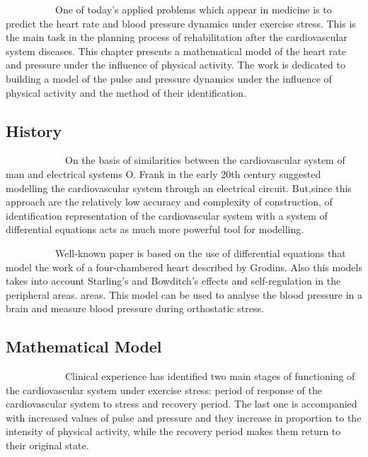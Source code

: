 \par ~~~~~~~~~~One of today’s applied problems which appear in medicine is to predict the heart rate and blood pressure dynamics under exercise stress. This is the main task in the planning process of rehabilitation after the cardiovascular system diseases. This chapter presents a mathematical model of the heart rate and pressure under the influence of physical activity. The work is dedicated to building a model of the pulse and pressure dynamics under the influence of physical activity and the method of their identification.
\subsection*{History}
\par ~~~~~~~~~~~~On the basis of similarities between the cardiovascular system of man and electrical systems O. Frank in the early 20th century suggested modelling the cardiovascular system through an electrical circuit. But,since this approach are the relatively low accuracy and complexity of construction, of identification representation of the cardiovascular system with a system of differential equations acts as much more powerful tool for modelling.

\par ~~~~~~~~~~Well-known paper is based on the use of differential equations that model the work of a four-chambered heart described by Grodins. Also this models takes into account Starling’s and Bowditch’s effects
and self-regulation in the peripheral areas. areas. This model can be used to analyse the blood pressure in a brain and measure blood pressure during orthostatic stress.

\subsection*{Mathematical Model}
\par ~~~~~~~~~~~~Clinical experience has identified two main stages of functioning of the cardiovascular system under exercise stress: period of response of the cardiovascular system to stress and recovery period. The last one is accompanied with increased values of pulse and pressure and they increase in proportion to the intensity of physical activity, while the recovery period makes them return to their original state.




